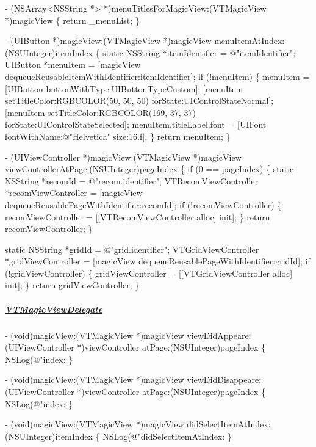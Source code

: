 \begin{DoxyCode}
- (NSArray<NSString *> *)menuTitlesForMagicView:(VTMagicView *)magicView
\{
    return \_menuList;
\}

- (UIButton *)magicView:(VTMagicView *)magicView menuItemAtIndex:(NSUInteger)itemIndex
\{
    static NSString *itemIdentifier = @"itemIdentifier";
    UIButton *menuItem = [magicView dequeueReusableItemWithIdentifier:itemIdentifier];
    if (!menuItem) \{
        menuItem = [UIButton buttonWithType:UIButtonTypeCustom];
        [menuItem setTitleColor:RGBCOLOR(50, 50, 50) forState:UIControlStateNormal];
        [menuItem setTitleColor:RGBCOLOR(169, 37, 37) forState:UIControlStateSelected];
        menuItem.titleLabel.font = [UIFont fontWithName:@"Helvetica" size:16.f];
    \}
    return menuItem;
\}

- (UIViewController *)magicView:(VTMagicView *)magicView viewControllerAtPage:(NSUInteger)pageIndex
\{
    if (0 == pageIndex) \{
        static NSString *recomId = @"recom.identifier";
        VTRecomViewController *recomViewController = [magicView dequeueReusablePageWithIdentifier:recomId];
        if (!recomViewController) \{
            recomViewController = [[VTRecomViewController alloc] init];
        \}
        return recomViewController;
    \}

    static NSString *gridId = @"grid.identifier";
    VTGridViewController *gridViewController = [magicView dequeueReusablePageWithIdentifier:gridId];
    if (!gridViewController) \{
        gridViewController = [[VTGridViewController alloc] init];
    \}
    return gridViewController;
\}
\end{DoxyCode}


\subparagraph*{\mbox{\hyperlink{class_v_t_magic_view_delegate-p}{V\+T\+Magic\+View\+Delegate}}}


\begin{DoxyCode}
- (void)magicView:(VTMagicView *)magicView viewDidAppeare:(UIViewController *)viewController
       atPage:(NSUInteger)pageIndex
\{
    NSLog(@"index:%
\}

- (void)magicView:(VTMagicView *)magicView viewDidDisappeare:(UIViewController *)viewController
       atPage:(NSUInteger)pageIndex
\{
    NSLog(@"index:%
\}

- (void)magicView:(VTMagicView *)magicView didSelectItemAtIndex:(NSUInteger)itemIndex
\{
    NSLog(@"didSelectItemAtIndex:%
\}
\end{DoxyCode}


